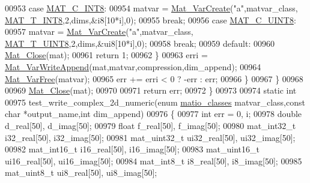 \begin{DoxyCode}
{{{00953                 \textcolor{keywordflow}{case} \hyperlink{group___m_a_t_ggad4d60ae7b709fc81bfd744fb4c857c40a984ff310f9e906100fcff95f704f43c5}{MAT\_C\_INT8}:
00954                     matvar = \hyperlink{group___m_a_t_ga1c54a84bb4d810c6fccdb8869489eac4}{Mat\_VarCreate}(\textcolor{stringliteral}{"a"},matvar\_class,
      \hyperlink{group___m_a_t_ggacf7b3b879282b7ab3a51190e49bf3453a9807f5033ed4f9b548953742d9fd1658}{MAT\_T\_INT8},2,dims,&i8[10*i],0);
00955                     \textcolor{keywordflow}{break};
00956                 \textcolor{keywordflow}{case} \hyperlink{group___m_a_t_ggad4d60ae7b709fc81bfd744fb4c857c40a81270f8093cb4808e992c1d29d84d4e3}{MAT\_C\_UINT8}:
00957                     matvar = \hyperlink{group___m_a_t_ga1c54a84bb4d810c6fccdb8869489eac4}{Mat\_VarCreate}(\textcolor{stringliteral}{"a"},matvar\_class,
      \hyperlink{group___m_a_t_ggacf7b3b879282b7ab3a51190e49bf3453a01c1bd7db68f90552862eb5d311be408}{MAT\_T\_UINT8},2,dims,&ui8[10*i],0);
00958                     \textcolor{keywordflow}{break};
00959                 \textcolor{keywordflow}{default}:
00960                     \hyperlink{group___m_a_t_ga101c92ff7bde4a2d4615661beba09262}{Mat\_Close}(mat);
00961                     \textcolor{keywordflow}{return} 1;
00962             \}
00963             erri = \hyperlink{group___m_a_t_ga9402f3f2fbec82fdb66bf1479c689727}{Mat\_VarWriteAppend}(mat,matvar,compression,dim\_append);
00964             \hyperlink{group___m_a_t_ga1d14716f7450530fd1c9d02413787f0e}{Mat\_VarFree}(matvar);
00965             err += erri < 0 ? -err : err;
00966         \}
00967     \}
00968 
00969     \hyperlink{group___m_a_t_ga101c92ff7bde4a2d4615661beba09262}{Mat\_Close}(mat);
00970 
00971     \textcolor{keywordflow}{return} err;
00972 \}
00973 
00974 \textcolor{keyword}{static} \textcolor{keywordtype}{int}
00975 test\_write\_complex\_2d\_numeric(\textcolor{keyword}{enum} \hyperlink{group___m_a_t_gad4d60ae7b709fc81bfd744fb4c857c40}{matio\_classes} matvar\_class,\textcolor{keyword}{const} \textcolor{keywordtype}{char} *output\_name,\textcolor{keywordtype}{int} 
      dim\_append)
00976 \{
00977     \textcolor{keywordtype}{int}    err = 0, i;
00978     \textcolor{keywordtype}{double}    d\_real[50], d\_imag[50];
00979     \textcolor{keywordtype}{float}     f\_real[50], f\_imag[50];
00980     mat\_int32\_t   i32\_real[50], i32\_imag[50];
00981     mat\_uint32\_t ui32\_real[50], ui32\_imag[50];
00982     mat\_int16\_t   i16\_real[50], i16\_imag[50];
00983     mat\_uint16\_t ui16\_real[50], ui16\_imag[50];
00984     mat\_int8\_t    i8\_real[50], i8\_imag[50];
00985     mat\_uint8\_t  ui8\_real[50], ui8\_imag[50];
}}}
\end{DoxyCode}
